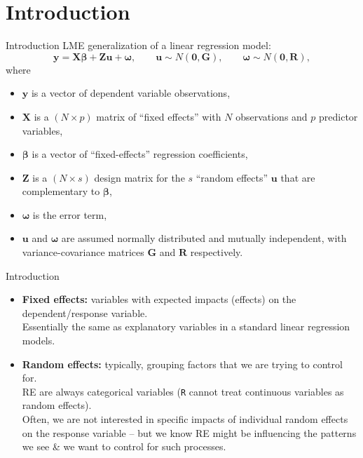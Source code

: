 \documentclass{beamer}
\begin{document}
\section{Introduction}
\begin{frame}{Introduction}
LME generalization of a linear regression model:
\medskip
$$
    \bm{y} = \bm{X \beta} + \bm{Z u} + \bm{\omega},  
    \qquad \bm{u} \sim N(\bm{0}, \bm{G}),
    \qquad \bm{\omega} \sim N(\bm{0}, \bm{R}),
$$
\medskip
\small
where 
\begin{itemize}
    \item[] $\bm{y}$ is a vector of dependent variable observations,
    \item[] $\bm{X}$ is a $(N\! \times \! p)$ matrix of ``fixed effects'' with $N$ observations and $p$ predictor variables,
    \item[] $\bm{\beta}$ is a vector of ``fixed-effects'' regression coefficients,
    \item[] $\bm{Z}$ is a $(N\! \times \! s)$ design matrix for the $s$ ``random effects'' $\bm{u}$ that are complementary to $\bm{\beta}$,
    \item[] $\bm{\omega}$ is the error term,
    \item[] $\bm{u}$ and $\bm{\omega}$ are assumed normally distributed and mutually independent, with variance-covariance matrices $\bm{G}$ and $\bm{R}$ respectively.
\end{itemize}   
\end{frame}
\begin{frame}{Introduction}
\begin{itemize}
    \item \textbf{Fixed effects:} variables with expected impacts (effects) on the dependent/response variable.\\ \medskip
    Essentially the same as explanatory variables in a standard linear regression models.
    \bigskip
    \item \textbf{Random effects:} typically, grouping factors that we are trying to control for. \\ \medskip RE are always categorical variables (\texttt{R} cannot treat continuous variables as random effects). \\ \medskip 
    Often, we are not interested in specific impacts of individual random effects on the response variable -- but we know RE might be influencing the patterns we see \& we want to control for such processes.
\end{itemize}
\end{frame}
\end{document}
